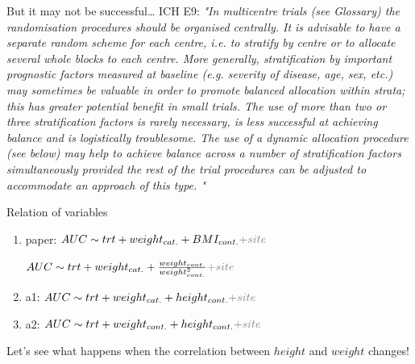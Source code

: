 \documentclass[english]{beamer}\usepackage[]{graphicx}\usepackage[]{xcolor}
\begin{document}
\begin{frame}[plain]{But it may not be successful\dots}
ICH E9:
\textit{
\tiny{
"In multicentre trials (see Glossary) the randomisation procedures should be organised centrally. It is advisable to have a separate random scheme for each centre, i.e. to stratify by centre or to allocate several whole blocks to each centre. More generally, stratification by important prognostic factors measured at baseline (e.g. severity of disease, age, sex, etc.) may sometimes be valuable in order to promote balanced allocation within strata; this has greater potential benefit in small trials. The use of more than two or three stratification factors is rarely necessary, is less successful at achieving balance and is logistically troublesome. The use of a dynamic allocation procedure (see below) may help to achieve balance across a number of stratification factors simultaneously provided the rest of the trial procedures can be adjusted to accommodate an approach of this type.}\footnotesize{
"
}
}

\end{frame}
\begin{frame}{Relation of variables}
\begin{enumerate}
\item paper: $AUC\sim trt + weight_{cat.} + BMI_{cont.}\textcolor{gray}{+ site}$

$AUC\sim trt + weight_{cat.} + \frac{weight_{cont.}}{weight_{cont.}^2}\textcolor{gray}{+ site}$
\item a1: $AUC\sim trt + weight_{cat.} + height_{cont.}\textcolor{gray}{+ site}$
\item a2: $AUC\sim trt + weight_{cont.} + height_{cont.}\textcolor{gray}{+ site}$
\end{enumerate}

Let's see what happens when the correlation between $height$ and $weight$ changes!




\end{frame}
\end{document}
